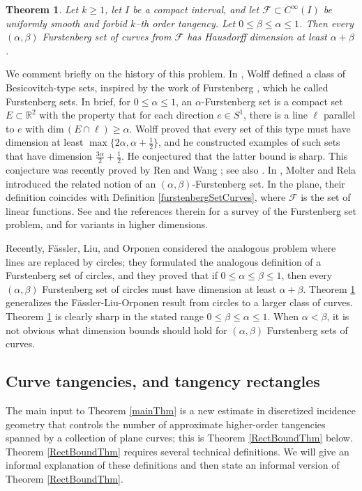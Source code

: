 \documentclass[letterpaper, reqno,11pt]{article}
\numberwithin{equation}{section}
\renewcommand{\dim}{\mathrm{dim}\,}
\newcommand{\RR}{\mathbb{R}}
\newtheorem{thm}{Theorem}
\numberwithin{thm}{section}
\theoremstyle{remark}
\begin{document}
\begin{thm}\label{generalizedFurstenbergSetsThm}
Let $k\geq 1$, let $I$ be a compact interval, and let $\mathcal{F}\subset C^\infty(I)$ be uniformly smooth and forbid $k$--th order tangency. Let $0\leq \beta \leq \alpha \leq 1$. Then every $(\alpha,\beta)$ Furstenberg set of curves from $\mathcal{F}$ has Hausdorff dimension at least $\alpha+\beta$. 
\end{thm}

We comment briefly on the history of this problem. In \cite{WolffKakeya}, Wolff defined a class of Besicovitch-type sets, inspired by the work of Furstenberg \cite{Fur}, which he called Furstenberg sets. In brief, for $0\leq\alpha\leq 1$, an $\alpha$-Furstenberg set is a compact set $E\subset\RR^2$ with the property that for each direction $e\in S^1$, there is a line $\ell$ parallel to $e$ with $\dim(E\cap\ell)\geq\alpha$. Wolff proved that every set of this type must have dimension at least $\max\big\{2\alpha,\alpha+\frac{1}{2}\big\}$, and he constructed examples of such sets that have dimension $\frac{3\alpha}{2} + \frac{1}{2}$. He conjectured that the latter bound is sharp. This conjecture was recently proved by Ren and Wang \cite{RW}; see also \cite{OrpSh2}. In \cite{MR}, Molter and Rela introduced the related notion of an $(\alpha,\beta)$-Furstenberg set. In the plane, their definition coincides with Definition \ref{furstenbergSetCurves}, where $\mathcal{F}$ is the set of linear functions. See \cite{OrpSh, OrpSh2} and the references therein for a survey of the Furstenberg set problem, and \cite{HKLO} for variants in higher dimensions. 

Recently, F\"assler, Liu, and Orponen \cite{FLO} considered the analogous problem where lines are replaced by circles; they formulated the analogous definition of a Furstenberg set of circles, and they proved that if $0\leq \alpha\leq\beta\leq 1$, then every $(\alpha,\beta)$  Furstenberg set of circles must have dimension at least $\alpha+\beta$. Theorem \ref{generalizedFurstenbergSetsThm} generalizes the F\"assler-Liu-Orponen result from circles to a larger class of curves. Theorem \ref{generalizedFurstenbergSetsThm} is clearly sharp in the stated range $0\leq \beta \leq \alpha \leq 1$. When $\alpha<\beta$, it is not obvious what dimension bounds should hold for $(\alpha,\beta)$ Furstenberg sets of curves.




\subsection{Curve tangencies, and tangency rectangles}\label{introTangencySection}
The main input to Theorem \ref{mainThm} is a new estimate in discretized incidence geometry that controls the number of approximate higher-order tangencies spanned by a collection of plane curves; this is Theorem \ref{RectBoundThm} below. Theorem \ref{RectBoundThm} requires several technical definitions. We will give an informal explanation of these definitions and then state an informal version of Theorem \ref{RectBoundThm}.
\end{document}
